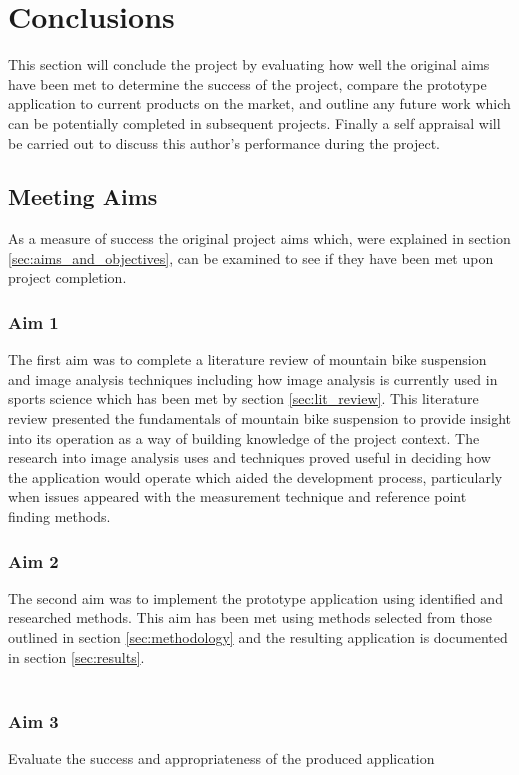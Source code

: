 \section{Conclusions}\label{sec:conclusion}
	This section will conclude the project by evaluating how well the original aims have been met to determine the success of the project, compare the prototype application to current products on the market, and outline any future work which can be potentially completed in subsequent projects. Finally a self appraisal will be carried out to discuss this author's performance during the project.
	\subsection{Meeting Aims}
		As a measure of success the original project aims which, were explained in section \ref{sec:aims_and_objectives}, can be examined to see if they have been met upon project completion. 
		\subsubsection{Aim 1}
			The first aim was to complete a literature review of mountain bike suspension and image analysis techniques including how image analysis is currently used in sports science which has been met by section \ref{sec:lit_review}. This literature review presented the fundamentals of mountain bike suspension to provide insight into its operation as a way of building knowledge of the project context. The research into image analysis uses and techniques proved useful in deciding how the application would operate which aided the development process, particularly when issues appeared with the measurement technique and reference point finding methods.
		\subsubsection{Aim 2}
			The second aim was to implement the prototype application using identified and researched methods. This aim has been met using methods selected from those outlined in section \ref{sec:methodology} and the resulting application is documented in section \ref{sec:results}.
			\\\\
		\subsubsection{Aim 3}
			Evaluate the success and appropriateness of the produced application
